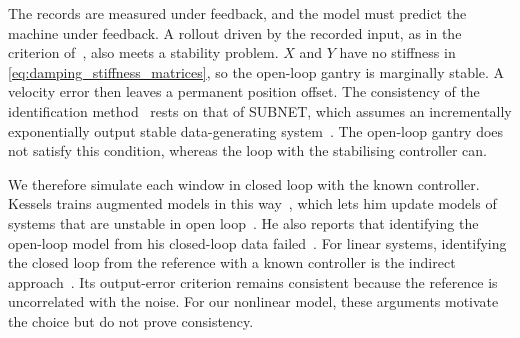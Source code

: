The records are measured under feedback, and the model must predict the
machine under feedback.
A rollout driven by the recorded input, as in the criterion
of~\cite[Eq.~(22)]{hoekstra2026lfr}, also meets a stability problem.
$X$ and $Y$ have no stiffness in \eqref{eq:damping_stiffness_matrices}, so the
open-loop gantry is marginally stable.
A velocity error then leaves a permanent position offset.
The consistency of the identification method~\cite[Sec.~5.5]{hoekstra2026lfr}
rests on that of SUBNET, which assumes an incrementally exponentially output
stable data-generating system~\cite[Cond.~1]{beintema2023subnet}.
The open-loop gantry does not satisfy this condition, whereas the loop with the
stabilising controller can.

We therefore simulate each window in closed loop with the known controller.
Kessels trains augmented models in this way~\cite[Eqs.~(5.12),
(5.13)]{kessels2025ai}, which lets him update models of systems that are
unstable in open loop~\cite[Ch.~5]{kessels2025ai}.
He also reports that identifying the open-loop model from his closed-loop data
failed~\cite[Remark~5.6]{kessels2025ai}.
For linear systems, identifying the closed loop from the reference with a known
controller is the indirect approach~\cite{forssell1999revisited}.
Its output-error criterion remains consistent because the reference is
uncorrelated with the noise.
For our nonlinear model, these arguments motivate the choice but do not prove
consistency.

